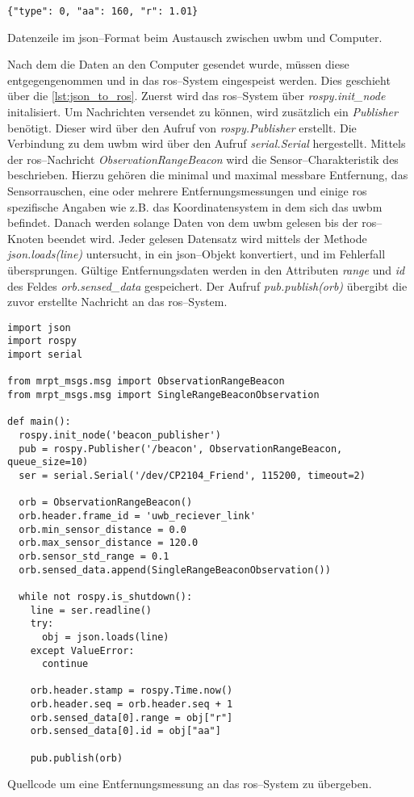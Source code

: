 \begin{listing}
	\begin{verbatim}
{"type": 0, "aa": 160, "r": 1.01}
	\end{verbatim}
	\unskip
	\caption{Datenzeile im \Gls{json}--Format beim Austausch zwischen \Gls{uwbm} und Computer.}
	\label{lst:data_in_json_format}
\end{listing}

Nach dem die Daten an den Computer gesendet wurde, müssen diese entgegengenommen und in das \Gls{ros}--System eingespeist werden. Dies geschieht über die \autoref{lst:json_to_ros}.
Zuerst wird das \Gls{ros}--System über \textit{rospy.init\_node} initalisiert. Um Nachrichten versendet zu können, wird zusätzlich ein \textit{Publisher} benötigt. Dieser wird über den Aufruf von \textit{rospy.Publisher} erstellt. Die Verbindung zu dem \Gls{uwbm} wird über den Aufruf \textit{serial.Serial} hergestellt.
Mittels der \Gls{ros}--Nachricht \textit{ObservationRangeBeacon} wird die Sensor--Charakteristik des  beschrieben. Hierzu gehören die minimal und maximal messbare Entfernung, das Sensorrauschen, eine oder mehrere Entfernungsmessungen und einige \Gls{ros} spezifische Angaben wie z.B. das Koordinatensystem in dem sich das \Gls{uwbm} befindet.
Danach werden solange Daten von dem \Gls{uwbm} gelesen bis der \Gls{ros}--Knoten beendet wird. Jeder gelesen Datensatz wird mittels der Methode \textit{json.loads(line)} untersucht, in ein \Gls{json}--Objekt konvertiert, und im Fehlerfall übersprungen. Gültige Entfernungsdaten werden in den Attributen \textit{range} und \textit{id} des Feldes \textit{orb.sensed\_data} gespeichert.
Der Aufruf \textit{pub.publish(orb)} übergibt die zuvor erstellte Nachricht an das \Gls{ros}--System.

\begin{listing}
	\begin{verbatim}
import json
import rospy
import serial

from mrpt_msgs.msg import ObservationRangeBeacon
from mrpt_msgs.msg import SingleRangeBeaconObservation

def main():
  rospy.init_node('beacon_publisher')
  pub = rospy.Publisher('/beacon', ObservationRangeBeacon, queue_size=10)
  ser = serial.Serial('/dev/CP2104_Friend', 115200, timeout=2)

  orb = ObservationRangeBeacon()
  orb.header.frame_id = 'uwb_reciever_link'
  orb.min_sensor_distance = 0.0
  orb.max_sensor_distance = 120.0
  orb.sensor_std_range = 0.1
  orb.sensed_data.append(SingleRangeBeaconObservation())

  while not rospy.is_shutdown():
    line = ser.readline()
    try:
      obj = json.loads(line)
    except ValueError:
      continue

    orb.header.stamp = rospy.Time.now()
    orb.header.seq = orb.header.seq + 1
    orb.sensed_data[0].range = obj["r"]
    orb.sensed_data[0].id = obj["aa"]

    pub.publish(orb)
	\end{verbatim}
	\unskip
	\caption{Quellcode um eine Entfernungsmessung an das \Gls{ros}--System zu übergeben.}
	\label{lst:json_to_ros}
\end{listing}

